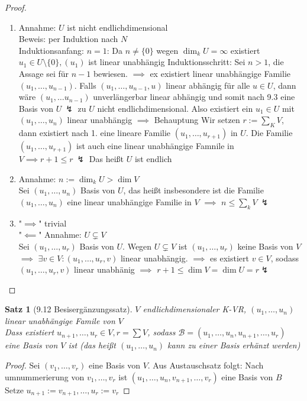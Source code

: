 \documentclass[a4paper]{scrartcl}
\DeclareMathOperator{\Exists}{\exists}
\theoremstyle{definition}
\theoremstyle{plain}
\newtheorem{thm}{Satz}
\theoremstyle{plain}
\theoremstyle{remark}
\theoremstyle{remark}
\theoremstyle{remark}
\theoremstyle{remark}
\theoremstyle{remark}
\begin{document}
\begin{proof}
\begin{enumerate}
\item Annahme: $U$ ist nicht endlichdimensional \\
     Beweis: per Induktion nach $N$ \\
     Induktionsanfang: $n = 1$: Da $n\neq \{0\}$ wegen $\dim_k U = \infty$ existiert $u_1 \in U \setminus \{0\}, (u_1)$ ist linear unabhängig
Induktionsschritt: Sei $n > 1$, die Assage sei für $n - 1$ bewiesen. $\implies$ ex existiert linear unabhängige Familie $(u_1, \ldots, u_{n - 1})$.
Falls $(u_1, \ldots, u_{n - 1}, u)$ linear abhängig für alle $u \in U$, dann wäre $(u_1, \ldots u_{n - 1})$ unverlängerbar linear abhängig und somit nach 9.3 eine Basis von $U~\lightning$ zu $U$ nicht endlichdimensional.
Also existiert ein $u_1 \in U$ mit $(u_1, \ldots, u_n)$ linear unabhängig $\implies$ Behauptung
Wir setzen $r:= \sum_K V$, dann existiert nach 1. eine lineare Familie $(u_1, \ldots, u_{r + 1})$ in $U$. Die Familie $(u_1, \ldots, u_{r + 1})$ ist auch eine linear unabhängige Famnile in $V \implies r + 1 \leq r ~ \lightning$ Das heißt $U$ ist endlich
\item Annahme: $n := \dim_k U > \dim V$ \\
     Sei $(u_1, \ldots, u_n)$ Basis von $U$, das heißt insbesondere ist die Familie $(u_1, \ldots, u_n)$ eine linear unabhängige Familie in $V$ $\implies$ $n \leq \sum_k V ~\lightning$
\item "$\implies$" trivial \\
     "$\impliedby$" Annahme: $U \subsetneq V$ \\
     Sei $(u_1, \ldots, u_r)$ Basis von $U$. Wegen $U \subsetneq V$ ist $(u_1, \ldots, u_r)$ keine Basis von $V$ $\implies$ $\Exists v\in V: (u_1, \ldots, u_r, v)$ linear unabhängig.
$\implies$ es existiert $v \in V$, sodass $(u_1, \ldots, u_r, v)$ linear unabhänig $\implies$ $r + 1 \leq \dim V = \dim U = r \lightning$
\end{enumerate}
\end{proof}
\begin{thm}[9.12 Besisergänzungssatz]
$V$ endlichdimensionaler K-VR, $(u_1, \ldots, u_n)$ linear unabhängige Famile von $V$ \\
  Dass existiert $u_{n + 1}, \ldots, u_r \in V, r = \sum V$, sodass $\mathcal{B} = (u_1, \ldots, u_n, u_{n + 1}, \ldots, u_r)$ eine Basis von $V$ ist (das heißt $(u_1, \ldots, u_n)$ kann zu einer Basis erhänzt werden)
\end{thm}
\begin{proof}
Sei $(v_1, \ldots, v_r)$ eine Basis von $V$. Aus Austauschsatz folgt: Nach umnummerierung von $v_1, \ldots, v_r$ ist $(u_1, \ldots, u_n,  v_{n + 1}, \ldots, v_r)$ eine Basis von $B$ Setze $u_{n + 1} := v_{n + 1}, \ldots, u_r := v_r$
\end{proof}
\end{document}
